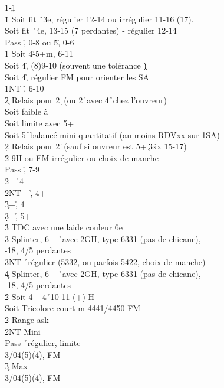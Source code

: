 \documentclass[a4paper]{article}
\begin{document}
\begin{bidtable}
1\c-1\d\+\\
1\h \> Soit fit \h\ 3e, régulier 12-14 ou irrégulier 11-16 (17).\\
\>Soit fit \h\ 4e, 13-15 (7 perdantes) - régulier 12-14\+\\
Pass \h , 0-8 ou 5\h , 0-6\\
1\s \> Soit 4\h -5+m, 6-11\\
\>Soit 4\h , (8)9-10 (souvent une tolérance \c )\\
\>Soit 4\h , régulier FM pour orienter les SA\\
1NT \h , 6-10\\
2\c \> Relais pour 2\d\ (ou 2\h\ avec 4\h\ chez l'ouvreur)\\
\>Soit faible à \d \\
\>Soit limite avec 5+\h \\
\>Soit 5\h\ balancé mini quantitatif (au moins RDVxx sur 1SA)\\
2\d \> Relais pour 2\h\ (sauf si ouvreur est 5+\c\ 3\h xx 15-17)\+\\
2\h {}-9H ou FM irrégulier ou choix de manche\+\\
Pass \h , 7-9\\
2\s {}+\h\ 4+\s \\
2NT +\h , 4+\c \\
3\c {}+\h , 4\d \\
3\d {}+\h , 5+\d \\
3\h \> TDC avec une laide couleur 6e\\
3\s \> Splinter, 6+ \h\ avec 2GH, type 6331 (pas de chicane),\\
-18, 4/5 perdantes              \\
3NT \h\ régulier (5332, ou parfois 5422, choix de manche)\\
4\c\d \> Splinter, 6+ \h\ avec 2GH, type 6331 (pas de chicane),\\
-18, 4/5 perdantes\-\-\\
2\h \> Soit 4\s\ - 4\h\ 10-11 (+) H\\
\>Soit Tricolore court m 4441/4450 FM \\
2\s \> Range ask\+\\
2NT \> Mini\+\\
Pass \h\ régulier, limite\\
3\s {}/04(5)(4), FM\-\\
3\c \> Max\+\\
3\s {}/04(5)(4), FM\\

\end{bidtable}
\end{document}
